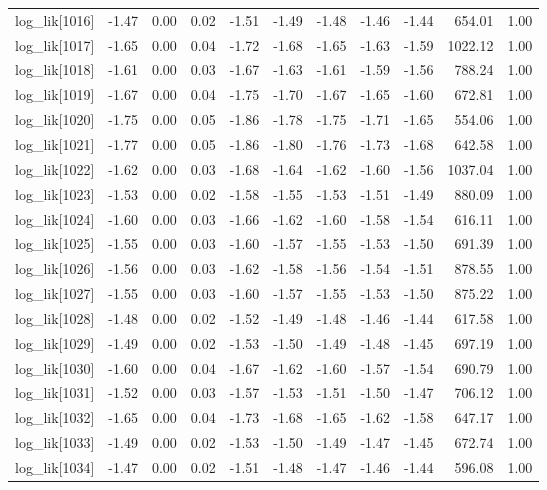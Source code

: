 \begin{table}[ht]
\begin{tabular}{rrrrrrrrrrr}
  log\_lik[1016] & -1.47 & 0.00 & 0.02 & -1.51 & -1.49 & -1.48 & -1.46 & -1.44 & 654.01 & 1.00 \\ 
  log\_lik[1017] & -1.65 & 0.00 & 0.04 & -1.72 & -1.68 & -1.65 & -1.63 & -1.59 & 1022.12 & 1.00 \\ 
  log\_lik[1018] & -1.61 & 0.00 & 0.03 & -1.67 & -1.63 & -1.61 & -1.59 & -1.56 & 788.24 & 1.00 \\ 
  log\_lik[1019] & -1.67 & 0.00 & 0.04 & -1.75 & -1.70 & -1.67 & -1.65 & -1.60 & 672.81 & 1.00 \\ 
  log\_lik[1020] & -1.75 & 0.00 & 0.05 & -1.86 & -1.78 & -1.75 & -1.71 & -1.65 & 554.06 & 1.00 \\ 
  log\_lik[1021] & -1.77 & 0.00 & 0.05 & -1.86 & -1.80 & -1.76 & -1.73 & -1.68 & 642.58 & 1.00 \\ 
  log\_lik[1022] & -1.62 & 0.00 & 0.03 & -1.68 & -1.64 & -1.62 & -1.60 & -1.56 & 1037.04 & 1.00 \\ 
  log\_lik[1023] & -1.53 & 0.00 & 0.02 & -1.58 & -1.55 & -1.53 & -1.51 & -1.49 & 880.09 & 1.00 \\ 
  log\_lik[1024] & -1.60 & 0.00 & 0.03 & -1.66 & -1.62 & -1.60 & -1.58 & -1.54 & 616.11 & 1.00 \\ 
  log\_lik[1025] & -1.55 & 0.00 & 0.03 & -1.60 & -1.57 & -1.55 & -1.53 & -1.50 & 691.39 & 1.00 \\ 
  log\_lik[1026] & -1.56 & 0.00 & 0.03 & -1.62 & -1.58 & -1.56 & -1.54 & -1.51 & 878.55 & 1.00 \\ 
  log\_lik[1027] & -1.55 & 0.00 & 0.03 & -1.60 & -1.57 & -1.55 & -1.53 & -1.50 & 875.22 & 1.00 \\ 
  log\_lik[1028] & -1.48 & 0.00 & 0.02 & -1.52 & -1.49 & -1.48 & -1.46 & -1.44 & 617.58 & 1.00 \\ 
  log\_lik[1029] & -1.49 & 0.00 & 0.02 & -1.53 & -1.50 & -1.49 & -1.48 & -1.45 & 697.19 & 1.00 \\ 
  log\_lik[1030] & -1.60 & 0.00 & 0.04 & -1.67 & -1.62 & -1.60 & -1.57 & -1.54 & 690.79 & 1.00 \\ 
  log\_lik[1031] & -1.52 & 0.00 & 0.03 & -1.57 & -1.53 & -1.51 & -1.50 & -1.47 & 706.12 & 1.00 \\ 
  log\_lik[1032] & -1.65 & 0.00 & 0.04 & -1.73 & -1.68 & -1.65 & -1.62 & -1.58 & 647.17 & 1.00 \\ 
  log\_lik[1033] & -1.49 & 0.00 & 0.02 & -1.53 & -1.50 & -1.49 & -1.47 & -1.45 & 672.74 & 1.00 \\ 
  log\_lik[1034] & -1.47 & 0.00 & 0.02 & -1.51 & -1.48 & -1.47 & -1.46 & -1.44 & 596.08 & 1.00 \\ 

\end{tabular}
\end{table}
